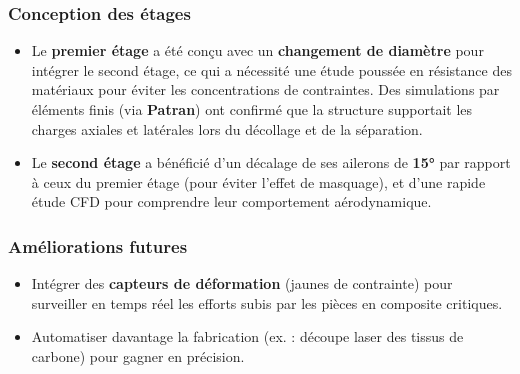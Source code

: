 \subsubsection*{Conception des étages}
\begin{itemize}
    \item Le \textbf{premier étage} a été conçu avec un \textbf{changement de diamètre} pour intégrer le second étage, ce qui a nécessité une étude poussée en résistance des matériaux pour éviter les concentrations de contraintes. Des simulations par éléments finis (via \textbf{Patran}) ont confirmé que la structure supportait les charges axiales et latérales lors du décollage et de la séparation.
    \item Le \textbf{second étage} a bénéficié d’un décalage de ses ailerons de \textbf{15°} par rapport à ceux du premier étage (pour éviter l’effet de masquage), et d'une rapide étude CFD pour comprendre leur comportement aérodynamique.
\end{itemize}

\subsubsection*{Améliorations futures}
\begin{itemize}
    \item Intégrer des \textbf{capteurs de déformation} (jaunes de contrainte) pour surveiller en temps réel les efforts subis par les pièces en composite critiques.
    \item Automatiser davantage la fabrication (ex. : découpe laser des tissus de carbone) pour gagner en précision.
\end{itemize}
